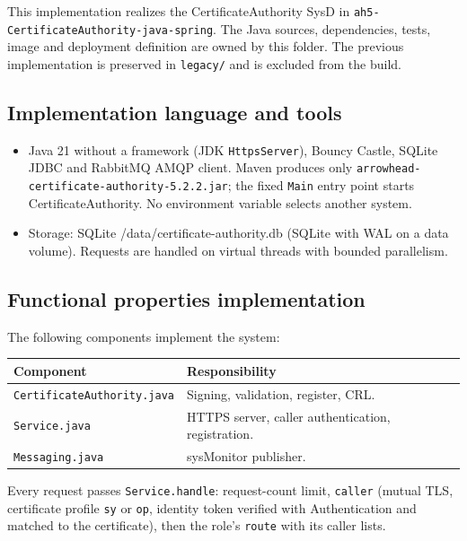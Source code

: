 \documentclass[a4paper]{arrowhead}
\begin{document}
This implementation realizes the CertificateAuthority SysD in \texttt{ah5-\allowbreak{}CertificateAuthority-\allowbreak{}java-\allowbreak{}spring}. The Java sources, dependencies, tests, image and deployment definition are owned by this folder. The previous implementation is preserved in \texttt{legacy/\allowbreak{}} and is excluded from the build.

\subsection{Implementation language and tools}
\begin{itemize}
\item Java 21 without a framework (JDK \texttt{HttpsServer}), Bouncy Castle, SQLite JDBC and RabbitMQ AMQP client. Maven produces only \texttt{arrowhead-\allowbreak{}certificate-\allowbreak{}authority-\allowbreak{}5.2.2.jar}; the fixed \texttt{Main} entry point starts CertificateAuthority. No environment variable selects another system.
\item Storage: SQLite /data/certificate-authority.db (SQLite with WAL on a data volume). Requests are handled on virtual threads with bounded parallelism.
\end{itemize}

\subsection{Functional properties implementation}

The following components implement the system:

\noindent\begin{longtable}{| p{5.6cm} | p{9.6cm} |} \hline
\rowcolor{gray!33} Component & Responsibility \\ \hline \endhead
\texttt{Certificate\allowbreak{}Authority.\allowbreak{}java} & Signing, validation, register, CRL. \\ \hline
\texttt{Service.\allowbreak{}java} & HTTPS server, caller authentication, registration. \\ \hline
\texttt{Messaging.\allowbreak{}java} & sysMonitor publisher. \\ \hline
\end{longtable}

Every request passes \texttt{Service.\allowbreak{}handle}: request-count limit, \texttt{caller} (mutual TLS, certificate profile \texttt{sy} or \texttt{op}, identity token verified with Authentication and matched to the certificate), then the role's \texttt{route} with its caller lists.
\end{document}
